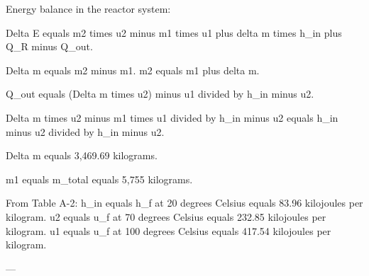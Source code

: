 Energy balance in the reactor system:  

Delta E equals m2 times u2 minus m1 times u1 plus delta m times h_in plus Q_R minus Q_out.  

Delta m equals m2 minus m1.  
m2 equals m1 plus delta m.  

Q_out equals (Delta m times u2) minus u1 divided by h_in minus u2.  

Delta m times u2 minus m1 times u1 divided by h_in minus u2 equals h_in minus u2 divided by h_in minus u2.  

Delta m equals 3,469.69 kilograms.  

m1 equals m_total equals 5,755 kilograms.  

From Table A-2:  
h_in equals h_f at 20 degrees Celsius equals 83.96 kilojoules per kilogram.  
u2 equals u_f at 70 degrees Celsius equals 232.85 kilojoules per kilogram.  
u1 equals u_f at 100 degrees Celsius equals 417.54 kilojoules per kilogram.  

---